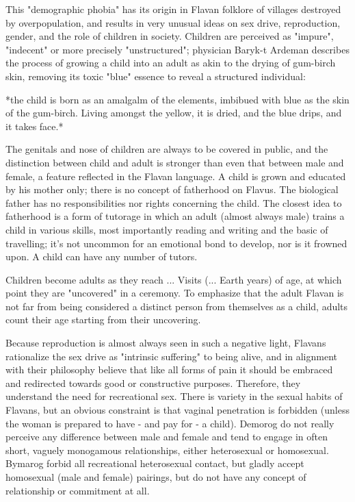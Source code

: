 \documentclass[10pt,oneside]{memoir}
\begin{document}
This "demographic phobia" has its origin in Flavan folklore of villages destroyed by overpopulation, and results in very unusual ideas on sex drive, reproduction, gender, and the role of children in society. Children are perceived as "impure", "indecent" or more precisely "unstructured"; physician Baryk-t Ardeman describes the process of growing a child into an adult as akin to the drying of gum-birch skin, removing its toxic "blue" essence to reveal a structured individual:

*the child is born as an amalgalm of the elements, imbibued with blue as the skin of the gum-birch. Living amongst the yellow, it is dried, and the blue drips, and it takes face.*

The genitals and nose of children are always to be covered in public, and the distinction between child and adult is stronger than even that between male and female, a feature reflected in the Flavan language. A child is grown and educated by his mother only; there is no concept of fatherhood on Flavus. The biological father has no responsibilities nor rights concerning the child. The closest idea to fatherhood is a form of tutorage in which an adult (almost always male) trains a child in various skills, most importantly reading and writing and the basic of travelling; it's not uncommon for an emotional bond to develop, nor is it frowned upon. A child can have any number of tutors.

Children become adults as they reach ... Visits (... Earth years) of age, at which point they are "uncovered" in a ceremony. To emphasize that the adult Flavan is not far from being considered a distinct person from themselves as a child, adults count their age starting from their uncovering.

Because reproduction is almost always seen in such a negative light, Flavans rationalize the sex drive as "intrinsic suffering" to being alive, and in alignment with their philosophy believe that like all forms of pain it should be embraced and redirected towards good or constructive purposes. Therefore, they understand the need for recreational sex. There is variety in the sexual habits of Flavans, but an obvious constraint is that vaginal penetration is forbidden (unless the woman is prepared to have - and pay for - a child). Demorog do not really perceive any difference between male and female and tend to engage in often short, vaguely monogamous relationships, either heterosexual or homosexual. Bymarog forbid all recreational heterosexual contact, but gladly accept homosexual (male and female) pairings, but do not have any concept of relationship or commitment at all.
\end{document}
